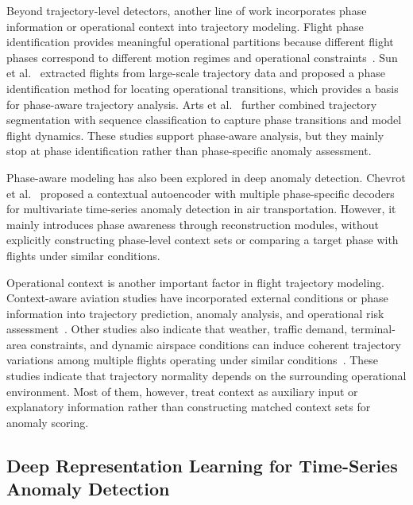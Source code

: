 \documentclass[iicol,pdflatex,sn-basic,Numbered]{sn-jnl}%
\theoremstyle{thmstyleone}%
\theoremstyle{thmstyletwo}%
\theoremstyle{thmstylethree}%
\begin{document}
Beyond trajectory-level detectors, another line of work incorporates phase information or operational context into trajectory modeling.
Flight phase identification provides meaningful operational partitions because different flight phases correspond to different motion regimes and operational constraints~\cite{sun2017phaseidentification}. 
Sun et al.~\cite{sun2017phaseidentification} extracted flights from large-scale trajectory data and proposed a phase identification method for locating operational transitions, which provides a basis for phase-aware trajectory analysis. 
Arts et al.~\cite{arts2022trajectory} further combined trajectory segmentation with sequence classification to capture phase transitions and model flight dynamics.
These studies support phase-aware analysis, but they mainly stop at phase identification rather than phase-specific anomaly assessment.

Phase-aware modeling has also been explored in deep anomaly detection.
Chevrot et al.~\cite{chevrot2022cae} proposed a contextual autoencoder with multiple phase-specific decoders for multivariate time-series anomaly detection in air transportation. 
However, it mainly introduces phase awareness through reconstruction modules, without explicitly constructing phase-level context sets or comparing a target phase with flights under similar conditions.

Operational context is another important factor in flight trajectory modeling.
Context-aware aviation studies have incorporated external conditions or phase information into trajectory prediction, anomaly analysis, and operational risk assessment~\cite{aerospace9020091,app12031295,aerospace13030209,coelho2023analytics,choi2023stochastic}. 
Other studies also indicate that weather, traffic demand, terminal-area constraints, and dynamic airspace conditions can induce coherent trajectory variations among multiple flights operating under similar conditions~\cite{yang2024optimising,chen2025impact,sydorenko2025optimizing}.
These studies indicate that trajectory normality depends on the surrounding operational environment.
Most of them, however, treat context as auxiliary input or explanatory information rather than constructing matched context sets for anomaly scoring.

\subsection{Deep Representation Learning for Time-Series Anomaly Detection}
\end{document}
